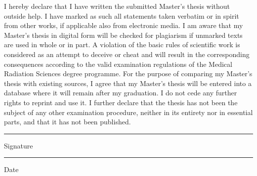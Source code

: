 I hereby declare that I have written the submitted Master's thesis without outside help. I have marked as such all statements taken verbatim or in spirit from other works, if applicable also from electronic media. I am aware that my Master's thesis in digital form will be checked for plagiarism if unmarked texts are used in whole or in part. A violation of the basic rules of scientific work is considered as an attempt to deceive or cheat and will result in the corresponding consequences according to the valid examination regulations of the Medical Radiation Sciences degree programme. For the purpose of comparing my Master's thesis with existing sources, I agree that my Master's thesis will be entered into a database where it will remain after my graduation. I do not cede any further rights to reprint and use it. I further declare that the thesis has not been the subject of any other examination procedure, neither in its entirety nor in essential parts, and that it has not been published.

\vspace*{2cm}
\parbox{4cm}{\centering\hrule
\strut \centering Signature} \hfill\parbox{4cm}{\hrule
\strut \centering Date}